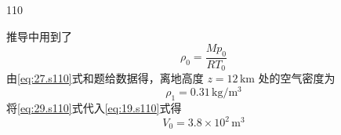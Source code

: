 \begin{solution}{110}
\begin{subsolution}
\begin{equation}
\label{eq:27.s110}
\end{equation}
推导中用到了
\begin{equation}
\rho_{0} = \frac{M p_{0}}{R T_{0}}
\label{eq:28.s110}
\end{equation}
由\eqref{eq:27.s110}式和题给数据得，离地高度 $z = 12\,\mathrm{km}$ 处的空气密度为
\begin{equation}
\rho_{1} = 0.31\,\mathrm{kg/m^{3}}
\label{eq:29.s110}
\end{equation}
将\eqref{eq:29.s110}式代入\eqref{eq:19.s110}式得
\begin{equation}
V_{0} = 3.8 \times 10^{2}\,\mathrm{m^{3}}
\label{eq:30.s110}
\end{equation}
\end{subsolution}
\end{solution}